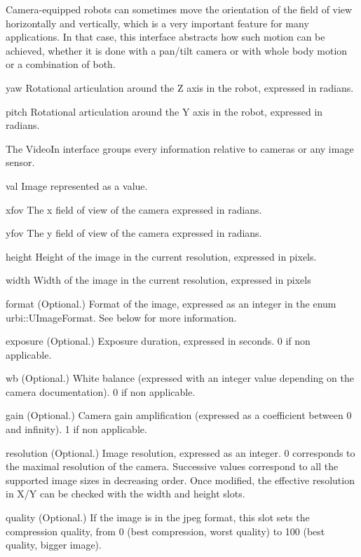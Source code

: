 
Camera-equipped robots can sometimes move the orientation of the field of
view horizontally and vertically, which is a very important feature for many
applications. In that case, this interface abstracts how such motion can be
achieved, whether it is done with a pan/tilt camera or with whole body
motion or a combination of both.

\begin{urbiscriptapi}
\item[yaw] Rotational articulation around the Z axis in the robot, expressed
  in radians.
\item[pitch] Rotational articulation around the Y axis in the robot,
  expressed in radians.
\end{urbiscriptapi}


The VideoIn interface groups every information relative to cameras or any
image sensor.

\begin{urbiscriptapi}
\item[val] Image represented as a  value.
\item[xfov] The x field of view of the camera expressed in radians.
\item[yfov] The y field of view of the camera expressed in radians.

\item[height] Height of the image in the current resolution, expressed in
  pixels.

\item[width] Width of the image in the current resolution, expressed in
  pixels

\item[format] (Optional.)  Format of the image, expressed as an integer in
  the enum urbi::UImageFormat.  See below for more information.

\item[exposure] (Optional.) Exposure duration, expressed in seconds. 0 if
  non applicable.

\item[wb] (Optional.)  White balance (expressed with an integer value
  depending on the camera documentation). 0 if non applicable.

\item[gain] (Optional.)  Camera gain amplification (expressed as a
  coefficient between 0 and infinity). 1 if non applicable.

\item[resolution] (Optional.)  Image resolution, expressed as an integer. 0
  corresponds to the maximal resolution of the camera. Successive values
  correspond to all the supported image sizes in decreasing order.  Once
  modified, the effective resolution in X/Y can be checked with the width
  and height slots.

\item[quality] (Optional.)  If the image is in the jpeg format, this slot
  sets the compression quality, from 0 (best compression, worst quality) to
  100 (best quality, bigger image).
\end{urbiscriptapi}

